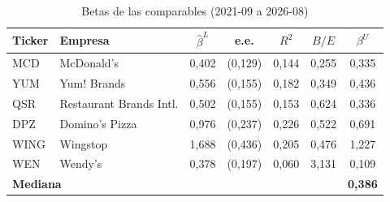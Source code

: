 \begin{table}[!htbp] \centering \scriptsize
\caption{Betas de las comparables (2021-09 a 2026-08)}
\begin{tabular}{llccccc}
\toprule
Ticker & Empresa & $\hat\beta^L$ & e.e. & $R^2$ & $B/E$ & $\beta^U$ \\
\midrule
MCD & McDonald's & 0{,}402 & (0{,}129) & 0{,}144 & 0{,}255 & 0{,}335 \\
YUM & Yum! Brands & 0{,}556 & (0{,}155) & 0{,}182 & 0{,}349 & 0{,}436 \\
QSR & Restaurant Brands Intl. & 0{,}502 & (0{,}155) & 0{,}153 & 0{,}624 & 0{,}336 \\
DPZ & Domino's Pizza & 0{,}976 & (0{,}237) & 0{,}226 & 0{,}522 & 0{,}691 \\
WING & Wingstop & 1{,}688 & (0{,}436) & 0{,}205 & 0{,}476 & 1{,}227 \\
WEN & Wendy's & 0{,}378 & (0{,}197) & 0{,}060 & 3{,}131 & 0{,}109 \\
\midrule
\multicolumn{6}{l}{\textbf{Mediana}} & \textbf{0{,}386} \\
\bottomrule
\end{tabular}
\end{table}
